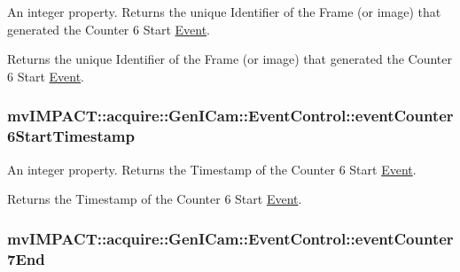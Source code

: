 An integer property. Returns the unique Identifier of the Frame (or image) that generated the Counter 6 Start \hyperlink{classmv_i_m_p_a_c_t_1_1acquire_1_1_event}{Event}. 

Returns the unique Identifier of the Frame (or image) that generated the Counter 6 Start \hyperlink{classmv_i_m_p_a_c_t_1_1acquire_1_1_event}{Event}. \hypertarget{classmv_i_m_p_a_c_t_1_1acquire_1_1_gen_i_cam_1_1_event_control_ab24afa90c18eaadacfd85dafda799599}{
\subsubsection[{event\+Counter6\+Start\+Timestamp}]{ mv\+I\+M\+P\+A\+C\+T\+::acquire\+::\+Gen\+I\+Cam\+::\+Event\+Control\+::event\+Counter6\+Start\+Timestamp}}\label{classmv_i_m_p_a_c_t_1_1acquire_1_1_gen_i_cam_1_1_event_control_ab24afa90c18eaadacfd85dafda799599}


An integer property. Returns the Timestamp of the Counter 6 Start \hyperlink{classmv_i_m_p_a_c_t_1_1acquire_1_1_event}{Event}. 

Returns the Timestamp of the Counter 6 Start \hyperlink{classmv_i_m_p_a_c_t_1_1acquire_1_1_event}{Event}. \hypertarget{classmv_i_m_p_a_c_t_1_1acquire_1_1_gen_i_cam_1_1_event_control_a0cf172f6094f0f66900be1a07ac8b7a8}{
\subsubsection[{event\+Counter7\+End}]{ mv\+I\+M\+P\+A\+C\+T\+::acquire\+::\+Gen\+I\+Cam\+::\+Event\+Control\+::event\+Counter7\+End}}\label{classmv_i_m_p_a_c_t_1_1acquire_1_1_gen_i_cam_1_1_event_control_a0cf172f6094f0f66900be1a07ac8b7a8}


